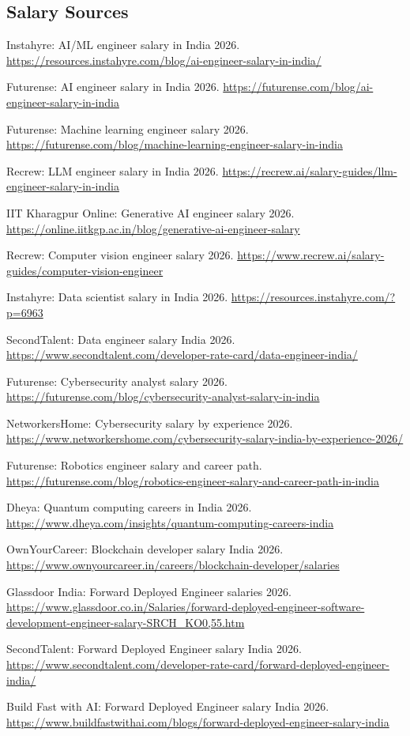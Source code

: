 \documentclass[10pt,a4paper]{article}
\begin{document}
\subsection*{Salary Sources}{\scriptsize\begin{enumerate}[label={[\arabic*]},itemsep=0pt]
\item Instahyre: AI/ML engineer salary in India 2026. \url{https://resources.instahyre.com/blog/ai-engineer-salary-in-india/}
\item Futurense: AI engineer salary in India 2026. \url{https://futurense.com/blog/ai-engineer-salary-in-india}
\item Futurense: Machine learning engineer salary 2026. \url{https://futurense.com/blog/machine-learning-engineer-salary-in-india}
\item Recrew: LLM engineer salary in India 2026. \url{https://recrew.ai/salary-guides/llm-engineer-salary-in-india}
\item IIT Kharagpur Online: Generative AI engineer salary 2026. \url{https://online.iitkgp.ac.in/blog/generative-ai-engineer-salary}
\item Recrew: Computer vision engineer salary 2026. \url{https://www.recrew.ai/salary-guides/computer-vision-engineer}
\item Instahyre: Data scientist salary in India 2026. \url{https://resources.instahyre.com/?p=6963}
\item SecondTalent: Data engineer salary India 2026. \url{https://www.secondtalent.com/developer-rate-card/data-engineer-india/}
\item Futurense: Cybersecurity analyst salary 2026. \url{https://futurense.com/blog/cybersecurity-analyst-salary-in-india}
\item NetworkersHome: Cybersecurity salary by experience 2026. \url{https://www.networkershome.com/cybersecurity-salary-india-by-experience-2026/}
\item Futurense: Robotics engineer salary and career path. \url{https://futurense.com/blog/robotics-engineer-salary-and-career-path-in-india}
\item Dheya: Quantum computing careers in India 2026. \url{https://www.dheya.com/insights/quantum-computing-careers-india}
\item OwnYourCareer: Blockchain developer salary India 2026. \url{https://www.ownyourcareer.in/careers/blockchain-developer/salaries}
\item Glassdoor India: Forward Deployed Engineer salaries 2026. \url{https://www.glassdoor.co.in/Salaries/forward-deployed-engineer-software-development-engineer-salary-SRCH_KO0,55.htm}
\item SecondTalent: Forward Deployed Engineer salary India 2026. \url{https://www.secondtalent.com/developer-rate-card/forward-deployed-engineer-india/}
\item Build Fast with AI: Forward Deployed Engineer salary India 2026. \url{https://www.buildfastwithai.com/blogs/forward-deployed-engineer-salary-india}
\end{enumerate}}
\end{document}

